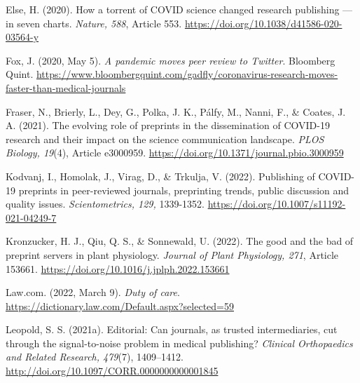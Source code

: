 \documentclass[authordate, perspective, issue]{jote-new-article}
\begin{document}
	Else, H. (2020). How a torrent of COVID science changed research publishing — in seven charts. \emph{Nature, 588}, Article 553. \url{https://doi.org/10.1038/d41586-020-03564-y}







	Fox, J. (2020, May 5). \emph{A pandemic moves peer review to Twitter}. Bloomberg Quint. \url{https://www.bloombergquint.com/gadfly/coronavirus-research-moves-faster-than-medical-journals}







	Fraser, N., Brierly, L., Dey, G., Polka, J. K., Pálfy, M., Nanni, F., \& Coates, J. A. (2021). The evolving role of preprints in the dissemination of COVID-19 research and their impact on the science communication landscape. \emph{PLOS Biology, 19}(4), Article e3000959. \url{https://doi.org/10.1371/journal.pbio.3000959}







	Kodvanj, I., Homolak, J., Virag, D., \& Trkulja, V. (2022). Publishing of COVID-19 preprints in peer-reviewed journals, preprinting trends, public discussion and quality issues. \emph{Scientometrics, 129, }1339-1352. \url{https://doi.org/10.1007/s11192-021-04249-7}







	Kronzucker, H. J., Qiu, Q. S., \& Sonnewald, U. (2022). The good and the bad of preprint servers in plant physiology. \emph{Journal of Plant Physiology, 271}, Article 153661. \url{https://doi.org/10.1016/j.jplph.2022.153661}







	Law.com. (2022, March 9). \emph{Duty of care}. \url{https://dictionary.law.com/Default.aspx?selected=59}







	Leopold, S. S. (2021a). Editorial: Can journals, as trusted intermediaries, cut through the signal-to-noise problem in medical publishing? \emph{Clinical Orthopaedics and Related Research, 479}(7), 1409--1412. \url{http://doi.org/10.1097/CORR.0000000000001845}
\end{document}
